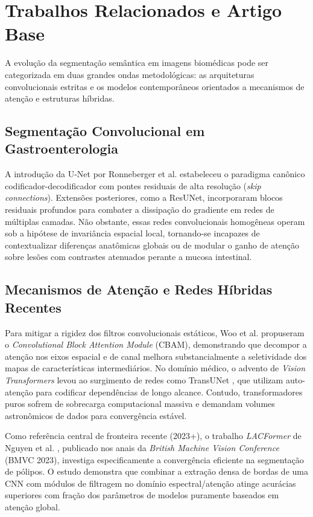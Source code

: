﻿\section{Trabalhos Relacionados e Artigo Base}
\label{sec:trabalhos_relacionados}

A evolu\c{c}\~{a}o da segmenta\c{c}\~{a}o sem\^{a}ntica em imagens biom\'{e}dicas pode ser categorizada em duas grandes ondas metodol\'{o}gicas: as arquiteturas convolucionais estritas e os modelos contempor\^{a}neos orientados a mecanismos de aten\c{c}\~{a}o e estruturas h\'{i}bridas.

\subsection{Segmenta\c{c}\~{a}o Convolucional em Gastroenterologia}
A introdu\c{c}\~{a}o da U-Net por Ronneberger et al. \cite{ronneberger2015unet} estabeleceu o paradigma can\^{o}nico codificador-decodificador com pontes residuais de alta resolu\c{c}\~{a}o (\textit{skip connections}). Extens\~{o}es posteriores, como a ResUNet, incorporaram blocos residuais profundos para combater a dissipa\c{c}\~{a}o do gradiente em redes de m\'{u}ltiplas camadas. N\~{a}o obstante, essas redes convolucionais homog\^{e}neas operam sob a hip\'{o}tese de invari\^{a}ncia espacial local, tornando-se incapazes de contextualizar diferen\c{c}as anat\^{o}micas globais ou de modular o ganho de aten\c{c}\~{a}o sobre les\~{o}es com contrastes atenuados perante a mucosa intestinal.

\subsection{Mecanismos de Aten\c{c}\~{a}o e Redes H\'{i}bridas Recentes}
Para mitigar a rigidez dos filtros convolucionais est\'{a}ticos, Woo et al. \cite{woo2018cbam} propuseram o \textit{Convolutional Block Attention Module} (CBAM), demonstrando que decompor a aten\c{c}\~{a}o nos eixos espacial e de canal melhora substancialmente a seletividade dos mapas de caracter\'{i}sticas intermedi\'{a}rios. No dom\'{i}nio m\'{e}dico, o advento de \textit{Vision Transformers} levou ao surgimento de redes como TransUNet \cite{chen2021transunet}, que utilizam auto-aten\c{c}\~{a}o para codificar depend\^{e}ncias de longo alcance. Contudo, transformadores puros sofrem de sobrecarga computacional massiva e demandam volumes astron\^{o}micos de dados para converg\^{e}ncia est\'{a}vel.

Como refer\^{e}ncia central de fronteira recente (2023+), o trabalho \textit{LACFormer} de Nguyen et al. \cite{lacformer2023}, publicado nos anais da \textit{British Machine Vision Conference} (BMVC 2023), investiga especificamente a converg\^{e}ncia eficiente na segmenta\c{c}\~{a}o de p\'{o}lipos. O estudo demonstra que combinar a extra\c{c}\~{a}o densa de bordas de uma CNN com m\'{o}dulos de filtragem no dom\'{i}nio espectral/aten\c{c}\~{a}o atinge acur\'{a}cias superiores com fra\c{c}\~{a}o dos par\^{a}metros de modelos puramente baseados em aten\c{c}\~{a}o global.

